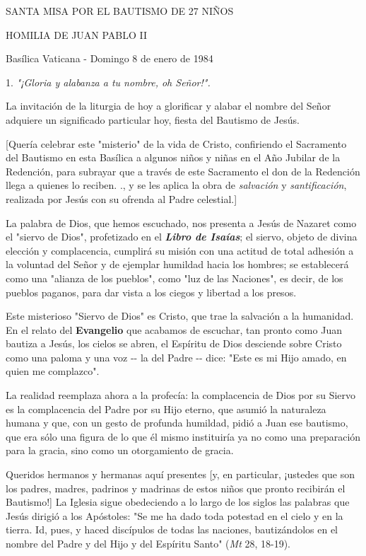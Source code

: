 \begin{body}
SANTA MISA POR EL BAUTISMO DE 27 NIÑOS

HOMILIA DE JUAN PABLO II

Basílica Vaticana - Domingo 8 de enero de 1984

1. \emph{"¡Gloria y alabanza a tu nombre, oh Señor!".}

La invitación de la liturgia de hoy a glorificar y alabar el nombre del Señor adquiere un significado particular hoy, fiesta del Bautismo de Jesús.

{[}Quería celebrar este "misterio" de la vida de Cristo, confiriendo el Sacramento del Bautismo en esta Basílica a algunos niños y niñas en el Año Jubilar de la Redención, para subrayar que a través de este Sacramento el don de la Redención llega a quienes lo reciben. ., y se les aplica la obra de \emph{salvación} y \emph{santificación}, realizada por Jesús con su ofrenda al Padre celestial.{]}

La palabra de Dios, que hemos escuchado, nos presenta a Jesús de Nazaret como el "siervo de Dios", profetizado en el \emph{\textbf{Libro de Isaías}}; el siervo, objeto de divina elección y complacencia, cumplirá su misión con una actitud de total adhesión a la voluntad del Señor y de ejemplar humildad hacia los hombres; se establecerá como una "alianza de los pueblos", como "luz de las Naciones", es decir, de los pueblos paganos, para dar vista a los ciegos y libertad a los presos.

Este misterioso "Siervo de Dios" es Cristo, que trae la salvación a la humanidad. En el relato del \textbf{Evangelio} que acabamos de escuchar, tan pronto como Juan bautiza a Jesús, los cielos se abren, el Espíritu de Dios desciende sobre Cristo como una paloma y una voz -\/- la del Padre -\/- dice: "Este es mi Hijo amado, en quien me complazco".

La realidad reemplaza ahora a la profecía: la complacencia de Dios por su Siervo es la complacencia del Padre por su Hijo eterno, que asumió la naturaleza humana y que, con un gesto de profunda humildad, pidió a Juan ese bautismo, que era sólo una figura de lo que él mismo instituiría ya no como una preparación para la gracia, sino como un otorgamiento de gracia.

Queridos hermanos y hermanas aquí presentes {[}y, en particular, ¡ustedes que son los padres, madres, padrinos y madrinas de estos niños que pronto recibirán el Bautismo!{]} La Iglesia sigue obedeciendo a lo largo de los siglos las palabras que Jesús dirigió a los Apóstoles: "Se me ha dado toda potestad en el cielo y en la tierra. Id, pues, y haced discípulos de todas las naciones, bautizándolos en el nombre del Padre y del Hijo y del Espíritu Santo" (\emph{Mt} 28, 18-19).


\end{body}
